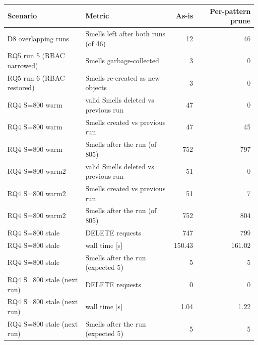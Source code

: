 \begin{tabular}{llrr}
\toprule
Scenario & Metric & As-is & Per-pattern prune \\
\midrule
D8 overlapping runs & Smells left after both runs (of 46) & 12 & 46 \\
RQ5 run 5 (RBAC narrowed) & Smells garbage-collected & 3 & 0 \\
RQ5 run 6 (RBAC restored) & Smells re-created as new objects & 3 & 0 \\
RQ4 S=800 warm & valid Smells deleted vs previous run & 47 & 0 \\
RQ4 S=800 warm & Smells created vs previous run & 47 & 45 \\
RQ4 S=800 warm & Smells after the run (of 805) & 752 & 797 \\
RQ4 S=800 warm2 & valid Smells deleted vs previous run & 51 & 0 \\
RQ4 S=800 warm2 & Smells created vs previous run & 51 & 7 \\
RQ4 S=800 warm2 & Smells after the run (of 805) & 752 & 804 \\
RQ4 S=800 stale & DELETE requests & 747 & 799 \\
RQ4 S=800 stale & wall time [s] & 150.43 & 161.02 \\
RQ4 S=800 stale & Smells after the run (expected 5) & 5 & 5 \\
RQ4 S=800 stale (next run) & DELETE requests & 0 & 0 \\
RQ4 S=800 stale (next run) & wall time [s] & 1.04 & 1.22 \\
RQ4 S=800 stale (next run) & Smells after the run (expected 5) & 5 & 5 \\
\bottomrule
\end{tabular}
